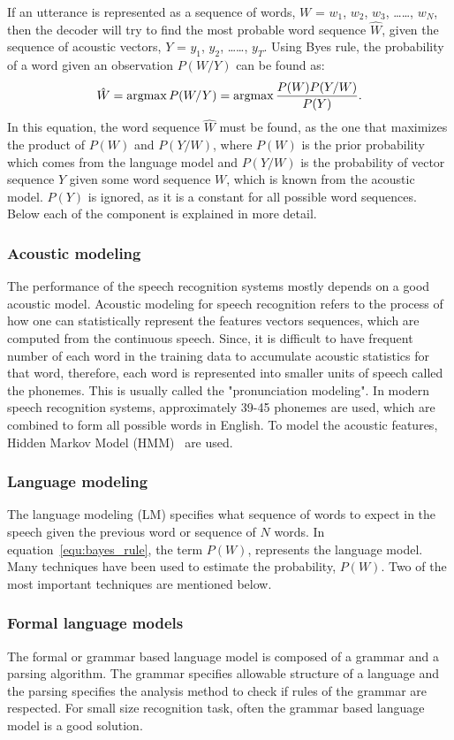 \documentclass[a4paper, 12pt]{article}
\newcommand{\argmax}{\operatornamewithlimits{argmax}}
\begin{document}
If an utterance is represented as a sequence of words, $W$ = $w_1$, $w_2$, $w_3$, \dots \dots, $w_N$, then the decoder will try to find the most probable word sequence $\hat{W}$, given the sequence of acoustic vectors, $Y$ = $y_1$, $y_2$, \dots \dots, $y_T$. Using Byes rule, the probability of a word given an observation $P(W/Y)$ can be found as: 
\begin{equation}
\label{equ:bayes_rule}
\hat{W} = \argmax P(W/Y) = \argmax\frac{P(W)P(Y/W)}{P(Y)}.
\end{equation}
In this equation, the word sequence $\hat{W}$ must be found, as the one that maximizes the product of $P(W)$ and $P(Y/W)$, where $P(W)$ is the prior probability which comes from the language model and $P(Y/W)$ is the probability of vector sequence $Y$ given some word sequence $W$, which is known from the acoustic model. $P(Y)$ is ignored, as it is a constant for all possible word sequences. Below each of the component is explained in more detail.
\subsubsection{Acoustic modeling}
The performance of the speech recognition systems mostly depends on a good acoustic model. Acoustic modeling for speech recognition refers to the process of how one can statistically represent the features vectors sequences, which are computed from the continuous speech. Since, it is difficult to have frequent number of each word in the training data to accumulate acoustic statistics for that word, therefore, each word is represented into smaller units of speech called the phonemes. This is usually called the  "pronunciation modeling". In modern speech recognition systems, approximately 39-45 phonemes are used, which are combined to form all possible words in English. To model the acoustic features, Hidden Markov Model (HMM)~\cite{hmm_for_SR} are used.

\subsubsection{Language modeling}
The language modeling (LM) specifies what sequence of words to expect in the speech given the previous word or sequence of $N$ words. In equation~\ref{equ:bayes_rule}, the term $P(W)$, represents the language model. Many techniques have been used to estimate the probability, $P(W)$. Two of the most important techniques are mentioned below.
\subsubsection*{Formal language models} 
\label{sec:gramar_based_lm}
The formal or grammar based language model is composed of a grammar and a parsing algorithm. The grammar specifies allowable structure of a language and the parsing specifies the analysis method to check if rules of the grammar are respected. For small size recognition task, often the grammar based language model is a good solution. 
\end{document}
